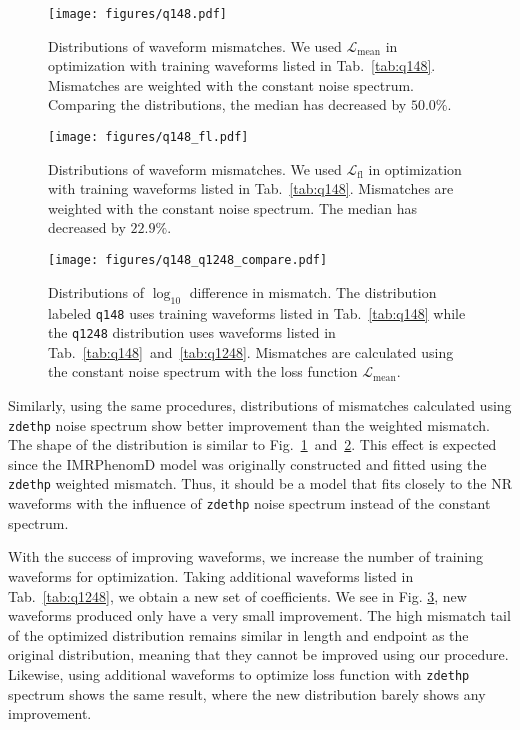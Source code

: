 \documentclass[twocolumn]{aastex631}
\newcommand{\kw}[1]{{\color{rb4}[KW: #1 ]}}
\newcommand{\zdethp}{\texttt{zdethp}}
\begin{document}

\begin{figure}[t]
	\centering
	\texttt{[image: figures/q148.pdf]}
	\caption{Distributions of waveform mismatches. We used $\mathcal{L}_{\mathrm{mean}}$ in optimization with training waveforms listed in Tab.~\ref{tab:q148}. Mismatches are weighted with the constant noise spectrum. Comparing the distributions, the median has decreased by $50.0\%$.}
	\label{fig:q148}
\end{figure}
\begin{figure}[t]
	\centering
	\texttt{[image: figures/q148\_fl.pdf]}
	\caption{Distributions of waveform mismatches. We used $\mathcal{L}_{\mathrm{fl}}$ in optimization with training waveforms listed in Tab.~\ref{tab:q148}. Mismatches are weighted with the constant noise spectrum. The median has decreased by $22.9\%$.}
	\label{fig:q148_fl}
\end{figure}
\begin{figure}[t]
	\centering
	\texttt{[image: figures/q148\_q1248\_compare.pdf]}
	\caption{Distributions of $\log_{10}$ difference in mismatch. The distribution labeled \texttt{q148} uses training waveforms listed in Tab.~\ref{tab:q148} while the \texttt{q1248} distribution uses waveforms listed in Tab.~\ref{tab:q148}~and~\ref{tab:q1248}. Mismatches are calculated using the constant noise spectrum with the loss function $\mathcal{L}_{\mathrm{mean}}$.}
	\label{fig:q148_q1248_compare}
\end{figure}

Similarly, using the same procedures, distributions of mismatches calculated using {\zdethp} noise spectrum show better improvement than the weighted mismatch. The shape of the distribution is similar to Fig.~\ref{fig:q148}~and~\ref{fig:q148_fl}. This effect is expected since the IMRPhenomD model was originally constructed and fitted using the {\zdethp} weighted mismatch. Thus, it should be a model that fits closely to the NR waveforms with the influence of {\zdethp} noise spectrum instead of the constant spectrum. 

With the success of improving waveforms, we increase the number of training waveforms for optimization. Taking additional waveforms listed in Tab.~\ref{tab:q1248}, we obtain a new set of coefficients. We see in Fig. \ref{fig:q148_q1248_compare}, new waveforms produced only have a very small improvement. The high mismatch tail of the optimized distribution remains similar in length and endpoint as the original distribution, meaning that they cannot be improved using our procedure. Likewise, using additional waveforms to optimize loss function with {\zdethp} spectrum shows the same result, where the new distribution barely shows any improvement. 
\end{document}
